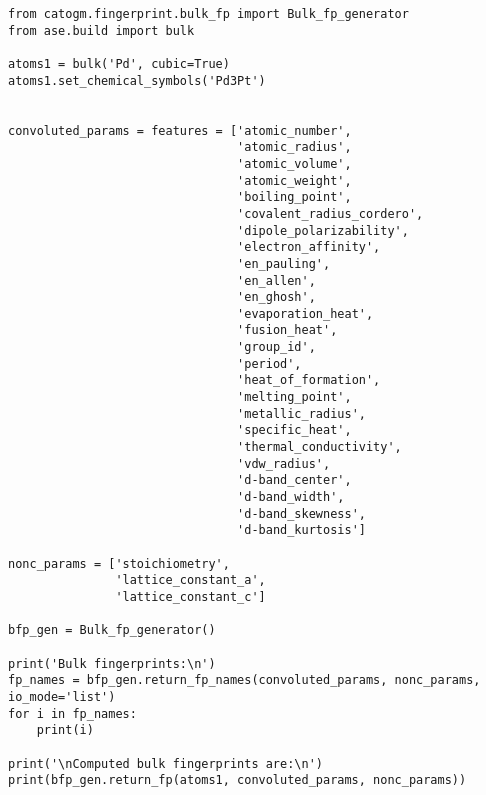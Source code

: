 \documentclass[11pt]{article}
\begin{document}
\begin{verbatim}
from catogm.fingerprint.bulk_fp import Bulk_fp_generator
from ase.build import bulk

atoms1 = bulk('Pd', cubic=True)
atoms1.set_chemical_symbols('Pd3Pt')


convoluted_params = features = ['atomic_number',
                                'atomic_radius',                                            
                                'atomic_volume',                                            
                                'atomic_weight',                                            
                                'boiling_point',                                            
                                'covalent_radius_cordero',                                  
                                'dipole_polarizability',                                    
                                'electron_affinity',                                        
                                'en_pauling',                                               
                                'en_allen',                                                 
                                'en_ghosh',                                                 
                                'evaporation_heat',                                         
                                'fusion_heat',                                              
                                'group_id',                                                 
                                'period',                                                   
                                'heat_of_formation',                                        
                                'melting_point',                                            
                                'metallic_radius',                                          
                                'specific_heat',                                            
                                'thermal_conductivity',                                     
                                'vdw_radius',                                               
                                'd-band_center',                                            
                                'd-band_width',                                             
                                'd-band_skewness',                                          
                                'd-band_kurtosis']     

nonc_params = ['stoichiometry', 
               'lattice_constant_a',                                       
               'lattice_constant_c']                                       

bfp_gen = Bulk_fp_generator()

print('Bulk fingerprints:\n')
fp_names = bfp_gen.return_fp_names(convoluted_params, nonc_params, io_mode='list')
for i in fp_names:
    print(i)

print('\nComputed bulk fingerprints are:\n')
print(bfp_gen.return_fp(atoms1, convoluted_params, nonc_params))
\end{verbatim}
\end{document}
